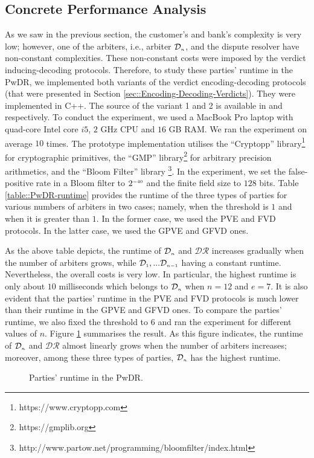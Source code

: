\subsection{Concrete Performance Analysis}

As we saw  in the previous section, the customer's and bank's complexity is very low; however, one of the arbiters, i.e., arbiter $\mathcal{D}_{\scriptscriptstyle n}$, and the dispute resolver have non-constant complexities.  These non-constant  costs were  imposed by the verdict inducing-decoding protocols. Therefore, to study these parties' runtime in the PwDR, we  implemented both variants of the verdict encoding-decoding protocols (that were presented in Section  \ref{sec::Encoding-Decoding-Verdicts}). They  were implemented in C++. The source of the variant 1 and 2 is available in \cite{variant-1} and \cite{variant-2} respectively. To conduct the experiment, we used a MacBook Pro laptop with quad-core Intel core $i5$, $2$ GHz CPU and $16$ GB RAM. We ran the experiment on average $10$ times. The prototype implementation utilises the ``Cryptopp'' library\footnote{https://www.cryptopp.com}  for cryptographic primitives, the ``GMP'' library\footnote{https://gmplib.org} for arbitrary precision arithmetics, and the ``Bloom Filter'' library \footnote{http://www.partow.net/programming/bloomfilter/index.html}. In the experiment, we set the false-positive rate in a Bloom filter to $2^{\scriptscriptstyle -40}$ and  the finite field size to $128$ bits. Table \ref{table::PwDR-runtime} provides the runtime of the three types of parties for various numbers of arbiters in two cases; namely, when the threshold is $1$ and when it is greater than $1$. In the former case, we used the PVE and FVD protocols.  In the latter case, we used the GPVE and GFVD ones. 

\vspace{-5mm}

\vspace{-4mm}

As the above table depicts, the runtime of $\mathcal{D}_{\scriptscriptstyle n}$ and $\mathcal{DR}$   increases gradually when the number of arbiters grows, while  $\mathcal{D}_{\scriptscriptstyle 1},...\mathcal{D}_{\scriptscriptstyle n-1}$ having a constant runtime.  Nevertheless, the overall costs is very low. In particular, the highest runtime is only about $10$ milliseconds which belongs to $\mathcal{D}_{\scriptscriptstyle n}$ when $n=12$ and $e=7$. It is also evident that the parties' runtime in the PVE and FVD protocols is much lower than their runtime in the GPVE and GFVD ones. To compare the  parties' runtime, we also fixed the threshold to $6$ and ran the experiment for different values of $n$. Figure  \ref{plot::runtime} summarises the result. As this figure indicates, the  runtime of  $\mathcal{D}_{\scriptscriptstyle n}$ and $\mathcal{DR}$ almost linearly grows when the number of arbiters increases; moreover, among these three types of parties, $\mathcal{D}_{\scriptscriptstyle n}$  has the highest  runtime. 




\vspace{-2mm}

\begin{figure}[!htb]
\centering
{}
\caption{\small Parties' runtime in the PwDR.}\label{plot::runtime}
\end{figure}



\clearpage






